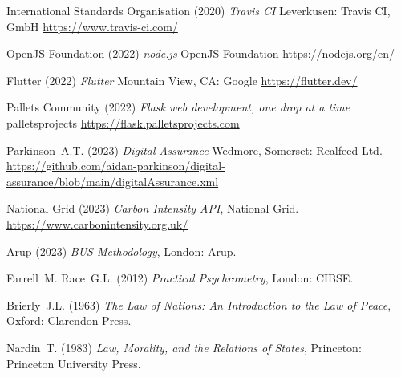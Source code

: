 \documentclass[11pt, oneside]{book}   	%
\begin{document}
\begin{thebibliography}{99}
 International Standards Organisation (2020)
\emph{Travis CI}
Leverkusen: Travis CI, GmbH
\url{https://www.travis-ci.com/}


 OpenJS Foundation (2022)
\emph{node.js}
OpenJS Foundation
\url{https://nodejs.org/en/}

 Flutter (2022)
\emph{Flutter}
Mountain View, CA: Google 
\url{https://flutter.dev/}

 Pallets Community (2022)
\emph{Flask web development, one drop at a time}
palletsprojects
\url{https://flask.palletsprojects.com}

 Parkinson~A.T. (2023)
\emph{Digital Assurance}
Wedmore, Somerset: Realfeed Ltd.
\url{https://github.com/aidan-parkinson/digital-assurance/blob/main/digitalAssurance.xml}

 National Grid (2023)
\emph{Carbon Intensity API},
National Grid.
\url{https://www.carbonintensity.org.uk/}

 Arup (2023)
\emph{BUS Methodology},
London: Arup.

 Farrell~M. Race~G.L. (2012)
\emph{Practical Psychrometry},
London: CIBSE.

 Brierly~J.L. (1963)
\emph{The Law of Nations: An Introduction to the Law of Peace},
Oxford: Clarendon Press.

 Nardin~T. (1983)
\emph{Law, Morality, and the Relations of States},
Princeton: Princeton University Press.

\end{thebibliography}

\newpage
\thispagestyle{empty}
\mbox{}
\newpage
\end{document}
